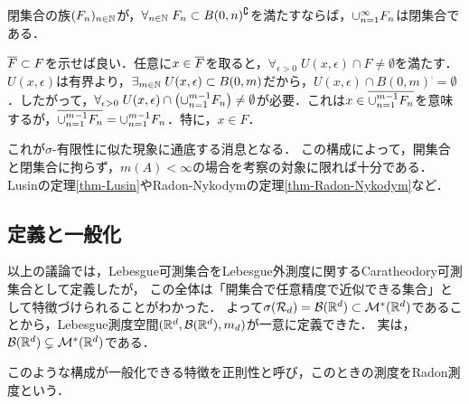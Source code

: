 \documentclass[uplatex, dvipdfmx]{jsreport}
\begin{document}
\begin{lemma}[位相空間論の補足]\label{lemma-general-topology}
    閉集合の族$(F_n)_{n\in\mathbb{N}}$が，$\forall_{n\in\mathbb{N}}\;F_n\subset B(0,n)^\complement$を満たすならば，$\cup_{n=1}^\infty F_n$は閉集合である．
\end{lemma}
\begin{Proof}
    $\overline{F}\subset F$を示せば良い．任意に$x\in\overline{F}$を取ると，$\forall_{\epsilon>0}\;U(x,\epsilon)\cap F\ne\emptyset$を満たす．$U(x,\epsilon)$は有界より，$\exists_{m\in\mathbb{N}}\;U(x,\epsilon)\subset B(0,m)$だから，$U(x,\epsilon)\cap B(0,m)^\comp=\emptyset$．したがって，$\forall_{\epsilon>0}\;U(x,\epsilon)\cap\left(\cup_{n=1}^{m-1}F_n\right)\ne\emptyset$が必要．これは$x\in\overline{\cup_{n=1}^{m-1}F_n}$を意味するが，$\overline{\cup_{n=1}^{m-1}F_n}=\cup_{n=1}^{m-1}F_n$．特に，$x\in F$．
\end{Proof}
\begin{remarks}
    これが$\sigma$-有限性に似た現象に通底する消息となる．
    この構成によって，開集合と閉集合に拘らず，$m(A)<\infty$の場合を考察の対象に限れば十分である．
    Lusinの定理\ref{thm-Lusin}やRadon-Nykodymの定理\ref{thm-Radon-Nykodym}など．
\end{remarks}

\subsection{定義と一般化}

\begin{tcolorbox}[colframe=ForestGreen, colback=ForestGreen!10!white,breakable,colbacktitle=ForestGreen!40!white,coltitle=black,fonttitle=\bfseries\sffamily,
    title=]
    以上の議論では，Lebesgue可測集合をLebesgue外測度に関するCaratheodory可測集合として定義したが，
    この全体は「開集合で任意精度で近似できる集合」として特徴づけられることがわかった．
    よって$\sigma(\mathcal{R}_d)=\mathcal{B}(\mathbb{R}^d)\subset\mathcal{M}^*(\mathbb{R}^d)$であることから，Lebesgue測度空間$(\mathbb{R}^d,\mathcal{B}(\mathbb{R}^d),m_d)$が一意に定義できた．
    実は，$\mathcal{B}(\mathbb{R}^d)\subsetneq\mathcal{M}^*(\mathbb{R}^d)$である．

    このような構成が一般化できる特徴を正則性と呼び，このときの測度をRadon測度という．
\end{tcolorbox}
\end{document}
